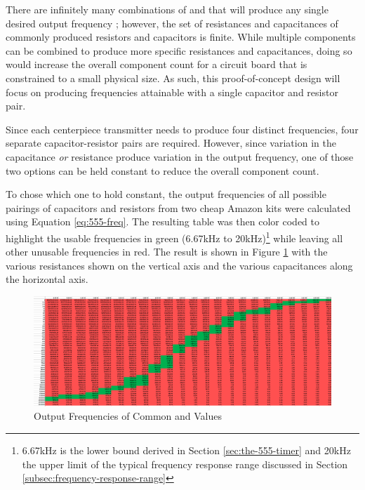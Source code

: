 There are infinitely many combinations of  and  that
will produce any single desired output frequency ; however, the
set of resistances and capacitances of commonly produced resistors and
capacitors is finite. While multiple components can be combined to
produce more specific resistances and capacitances, doing so would
increase the overall component count for a circuit board that is
constrained to a small physical size. As such, this proof-of-concept
design will focus on producing frequencies attainable with a single
capacitor and resistor pair.

Since each centerpiece transmitter needs to produce four distinct
frequencies, four separate capacitor-resistor pairs are required.
However, since variation in the capacitance \emph{or} resistance
produce variation in the output frequency, one of those two options can
be held constant to reduce the overall component count.

To chose which one to hold constant, the output frequencies of all
possible pairings of capacitors and resistors from two cheap Amazon
kits \cite{amazon-resistors} \cite{amazon-capacitors} were calculated
using Equation \ref{eq:555-freq}. The resulting table was then color
coded to highlight the usable frequencies in green (6.67kHz to
20kHz)\footnote{6.67kHz is the lower bound derived in Section
\ref{sec:the-555-timer} and 20kHz the upper limit of the typical
frequency response range discussed in Section
\ref{subsec:frequency-response-range}} while leaving all other unusable
frequencies in red. The result is shown in Figure
\ref{fig:freq-selection} with the various resistances shown on the
vertical axis and the various capacitances along the horizontal axis.

\begin{figure}[h]
    \centering
    \caption{Output Frequencies of Common  and  Values}
    \label{fig:freq-selection}
    \includegraphics[width=\linewidth]{Figures/6 PCB Design/freq_selection.png}
\end{figure}

